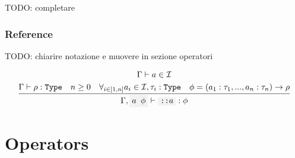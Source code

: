 \documentclass[11pt]{report}
\newcommand{\infrule}[3][gathered]{\frac{\begin{#1}#2\end{#1}}{\begin{gathered}#3\end{gathered}}}
\newcommand{\then}{\vdash}
\newcommand{\code}[1]{\texttt{\colorbox{gray!10}{#1}}}
\newcommand{\Id}{\mathcal{I}}
\newcommand{\Type}{\texttt{Type}}
\newcommand{\Env}{\Gamma}
\theoremstyle{definition}
\newcommand{\comment}[1]{
	\parbox{0.9\linewidth}{\color{black!30}\small\sffamily #1}
}
\begin{document}
\comment{TODO: completare}

\subsubsection{Reference}

\comment{TODO: chiarire notazione e muovere in sezione operatori}

\[
	\infrule{
		\Env\then a \in \Id \\*
		\Env\then \rho:\Type \quad n \geq 0 \quad \forall_{i\in[1,n]}{a_i \in \Id, \tau_i:\Type} \quad \phi = (a_1:\tau_1,...,a_n:\tau_n) \to \rho \\*
	}{
		\Env,\code{$a$ $\phi$}\then \code{::$a$} : \phi
	}
\]

\newpage

\section{Operators}
\end{document}
